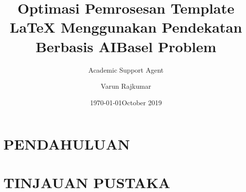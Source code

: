 \documentclass{article}
\title{Optimasi Pemrosesan Template LaTeX Menggunakan Pendekatan Berbasis AI}
\author{Academic Support Agent}
\date{\today}
\begin{document}
\maketitle

\begin{abstract}

\end{abstract}

\chapter{PENDAHULUAN}


\chapter{TINJAUAN PUSTAKA}


\usepackage[utf8]{inputenc}
\usepackage[english]{babel}
\usepackage[margin=1in]{geometry}

\usepackage{blindtext}
\usepackage{amssymb}
\usepackage{hyperref}
\hypersetup{
    colorlinks=true,
    linkcolor=blue,
    filecolor=magenta,      
    urlcolor=cyan,
}
 

\usepackage{amsthm}
\usepackage{amsmath}
\newtheorem{theorem}{Theorem}[section]
\newtheorem{corollary}{Corollary}[theorem]
\newtheorem{lemma}[theorem]{Lemma}
\theoremstyle{remark}
\newtheorem*{remark}{Remark}

\theoremstyle{definition}
\newtheorem{definition}{Definition}[section]

\title{Basel Problem}
\author{Varun Rajkumar}
\date{October 2019}
\end{document}
